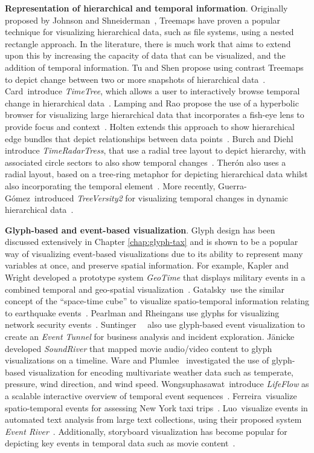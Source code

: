 \noindent\textbf{Representation of hierarchical and temporal information}. Originally proposed by Johnson and Shneiderman~\cite{johnson91}, Treemaps have proven a popular technique for visualizing hierarchical data, such as file systems, using a nested rectangle approach.
In the literature, there is much work that aims to extend upon this by increasing the capacity of data that can be visualized, and the addition of temporal information.
Tu and Shen propose using contrast Treemaps to depict change between two or more snapshots of hierarchical data~\cite{tu07}.
Card~\etal introduce \textit{TimeTree}, which allows a user to interactively browse temporal change in hierarchical data~\cite{card06}.
Lamping and Rao propose the use of a hyperbolic browser for visualizing large hierarchical data that incorporates a fish-eye lens to provide focus and context~\cite{lamping96}.
Holten extends this approach to show hierarchical edge bundles that depict relationships between data points~\cite{holten06}.
Burch and Diehl introduce \textit{TimeRadarTress}, that use a radial tree layout to depict hierarchy, with associated circle sectors to also show temporal changes~\cite{burch08}.
Ther\'{o}n also uses a radial layout, based on a tree-ring metaphor for depicting hierarchical data whilst also incorporating the temporal element~\cite{theron06}.
More recently, Guerra-G\'{o}mez~\etal introduced \textit{TreeVersity2} for visualizing temporal changes in dynamic hierarchical data~\cite{guerragomez13}.

\noindent\textbf{Glyph-based and event-based visualization}. Glyph design has been discussed extensively in Chapter \ref{chap:glyph-tax} and is shown to be a popular way of visualizing event-based visualizations due to its ability to represent many variables at once, and preserve spatial information.
For example, Kapler and Wright developed a prototype system \textit{GeoTime} that displays military events in a combined temporal and geo-spatial visualization~\cite{kapler04}.
Gatalsky~\etal use the similar concept of the ``space-time cube'' to visualize spatio-temporal information relating to earthquake events~\cite{gatalsky04}. 
Pearlman and Rheingans use glyphs for visualizing network security events~\cite{pearlman08}. 
Suntinger~\etal~\cite{suntinger08} also use glyph-based event visualization to create an \textit{Event Tunnel} for business analysis and incident exploration.
J\"{a}nicke~\etal~\cite{janicke10} developed \textit{SoundRiver} that mapped movie audio/video content to glyph visualizations on a timeline.
Ware and Plumlee~\cite{Ware01072013} investigated the use of glyph-based visualization for encoding multivariate weather data such as temperate, pressure, wind direction, and wind speed.
Wongsuphasawat~\etal introduce \emph{LifeFlow} as a scalable interactive overview of temporal event sequences~\cite{wongsuphasawat11}.
Ferreira~\etal visualize spatio-temporal events for assessing New York taxi trips~\cite{ferreira13}.
Luo~\etal visualize events in automated text analysis from large text collections, using their proposed system \textit{Event River}~\cite{luo12}.
Additionally, storyboard visualization has become popular for depicting key events in temporal data such as movie content~\cite{tanahashi12, liu13}.


